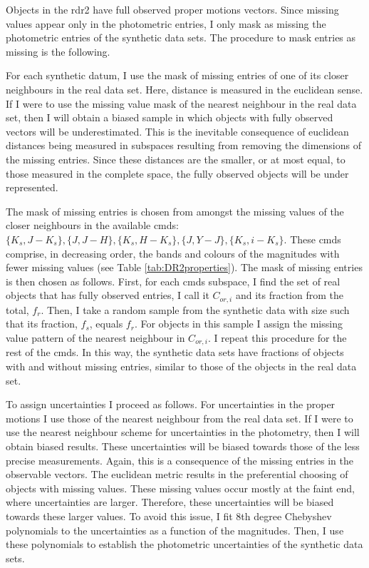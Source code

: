 Objects in the \gls{rdr2}  have full observed proper motions vectors. Since missing values appear only in the photometric entries, I only mask as missing the photometric entries of the synthetic data sets. The procedure to mask entries as missing is the following.

For each synthetic datum, I use the mask of missing entries of one of its closer neighbours in the real data set. Here, distance is measured in the euclidean sense. If I were to use the missing value mask of the nearest neighbour in the real data set, then I will obtain a biased sample in which objects with fully observed vectors will be underestimated. This is the inevitable consequence of  euclidean distances being measured in subspaces resulting from removing the dimensions of the missing entries. Since these distances are the smaller, or at most equal, to those measured in the complete space, the fully observed objects will be under represented.

The mask of missing entries is chosen from amongst the missing values of the closer neighbours in the available \glspl{cmd}: $\{K_s,J-K_s\},\{J,J-H\},\{K_s,H-K_s\},\{J,Y-J\},\{K_s,i-K_s\}$. These \glspl{cmd} comprise, in decreasing order, the bands and colours of the magnitudes with fewer missing values (see Table \ref{tab:DR2properties}).  The mask of missing entries is then chosen as follows. First, for each \glspl{cmd} subspace, I find the set of real objects that has fully observed entries, I call it $C_{or,i}$ and its fraction from the total, $f_r$. Then, I take a random sample from the synthetic data with size such that its fraction, $f_s$, equals $f_r$. For objects in this sample I assign the missing value pattern of the nearest neighbour in $C_{or,i}$. I repeat this procedure for the rest of the \glspl{cmd}. In this way, the synthetic data sets have fractions of objects with and without missing entries, similar to those of the objects in the real data set.


To assign uncertainties I proceed as follows. For uncertainties in the proper motions I use those of the nearest neighbour from the real data set. If I were to use the nearest neighbour scheme for uncertainties in the photometry, then I will obtain biased results. These uncertainties will be biased towards those of the less precise measurements. Again, this is a consequence of the missing entries in the observable vectors. The euclidean metric results in the preferential choosing of objects with missing values. These missing values occur mostly at the faint end, where uncertainties are larger. Therefore, these uncertainties will be biased towards these larger values. To avoid this issue, I fit 8th degree Chebyshev polynomials to the uncertainties as a function of the magnitudes. Then, I use these polynomials to establish the photometric uncertainties of the synthetic data sets.

